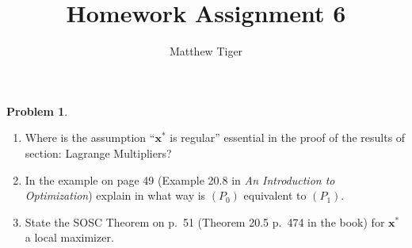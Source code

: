 \documentclass[12pt]{article}
\title{Homework Assignment 6}
\author{Matthew Tiger}
\theoremstyle{definition}
\newtheorem{problem}{Problem}
\newcommand{\vc}[1]{\boldsymbol{#1}}
\begin{document}
\maketitle


\begin{problem}
  \begin{enumerate}
    \item Where is the assumption ``$\vc{x}^*$ is regular'' essential in the proof of the results of section: Lagrange Multipliers?
    \item In the example on page 49 (Example 20.8 in \textit{An Introduction to Optimization}) explain in what way is $(P_0)$ equivalent to $(P_1)$.
    \item State the SOSC Theorem on p.\ 51 (Theorem 20.5 p.\ 474 in the book) for $\vc{x}^*$ a local maximizer.
  \end{enumerate}
\end{problem}
\end{document}
